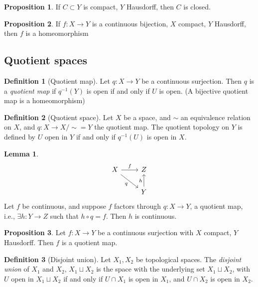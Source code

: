 \documentclass[a4paper,14pt]{extarticle}
\theoremstyle{definition}
\newtheorem*{definition}{Definition}
\newtheorem*{lemma}{Lemma}
\newtheorem*{proposition}{Proposition}
\begin{document}
\begin{proposition}
  If $C\subset Y$ is compact, $Y$ Hausdorff, then $C$ is closed.
\end{proposition}

\begin{proposition}
  If $f:X\rightarrow Y$ is a continuous bijection, $X$ compact, $Y$ Hausdorff, then $f$ 
  is a homeomorphism
\end{proposition}

\subsection{Quotient spaces}
\begin{definition}[Quotient map]
  Let $q:X\rightarrow Y$ be a continuous surjection. Then $q$ is a \emph{quotient map}
  if $q^{-1}(Y)$ is open if and only if $U$ is open. (A bijective quotient map is a 
  homeomorphism)
\end{definition}

\begin{definition}[Quotient space]
  Let $X$ be a space, and $\sim$ an equivalence relation on $X$, and 
  $q:X\rightarrow X/\sim = Y$ the quotient map. The quotient topology on $Y$ is defined by
  $U$ open in $Y$ if and only if $q^{-1}(U)$ is open in $X$.
\end{definition}

\begin{lemma}
  \[
  \begin{tikzcd}
    X \arrow{r}{f} \arrow[swap]{dr}{q} & Z  \\
     & Y \arrow{u}{h}
  \end{tikzcd}
\]
  Let $f$ be continuous, and suppose $f$ factors through $q:X\rightarrow Y$, a quotient 
  map, i.e., $\exists h:Y\rightarrow Z$ such that $h\circ q = f$. Then $h$ is continuous.
\end{lemma}

\begin{proposition}
  Let $f:X\rightarrow Y$ be a continuous surjection with $X$ compact, $Y$ Hausdorff. Then 
  $f$ is a quotient map. 
\end{proposition}

\begin{definition}[Disjoint union]
  Let $X_1,X_2$ be topological spaces. The \emph{disjoint union} of $X_1$ and $X_2$,
  $X_1\sqcup X_2$ is the space with the underlying set $X_1\sqcup X_2$, with $U$ open 
  in $X_1\sqcup X_2$ if and only if $U\cap X_1$ is open in $X_1$, and $U\cap X_2$ is 
  open in $X_2$.
\end{definition}
\end{document}
